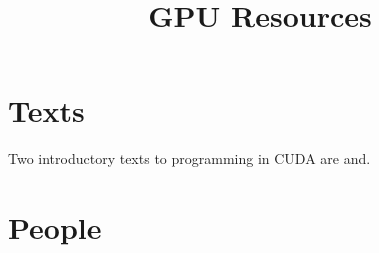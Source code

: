 \documentclass{article}
\title{GPU Resources}
\begin{document}
\section{Texts}

Two introductory texts to programming in CUDA are \cite{sanders2010cuda} and\cite{kirk2010programming}.

\section{People}





\end{document}
